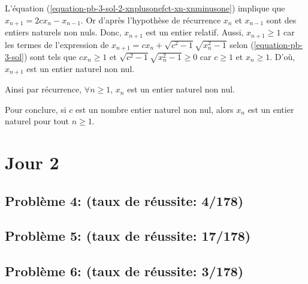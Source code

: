 \documentclass[12pt,a4paper,article]{memoir}
\begin{document}
L'équation (\ref{equation-pb-3-sol-2-xnplusonefct-xn-xnminusone}) implique que $x_{n+1} = 2cx_{n} - x_{n-1}$. Or d'après l'hypothèse de récurrence $x_{n}$ et $x_{n-1}$ sont des entiers naturels non nuls. Donc, $x_{n+1}$ est un entier relatif. Aussi, $x_{n+1} \geq 1$ car les termes de l'expression de $x_{n+1} = cx_{n} + \sqrt{c^2 - 1}\sqrt{x_{n}^2 - 1}$ selon (\ref{equation-pb-3-sol}) sont tels que $cx_{n} \geq 1$ et $\sqrt{c^2 - 1}\sqrt{x_{n}^2 - 1} \geq 0$ car $c \geq 1$ et $x_{n} \geq 1$. D'où, $x_{n+1}$ est un entier naturel non nul.

\bigskip

Ainsi par récurrence, $\forall n \geq 1$, $x_{n}$ est un entier naturel non nul.

\bigskip

Pour conclure, si $c$ est un nombre entier naturel non nul, alors $x_{n}$ est un entier naturel pour tout $n \geq 1$.

\section{Jour 2}
\subsection{Problème 4: (taux de réussite: 4/178)}
\subsection{Problème 5: (taux de réussite: 17/178)}
\subsection{Problème 6: (taux de réussite: 3/178)}
\end{document}
